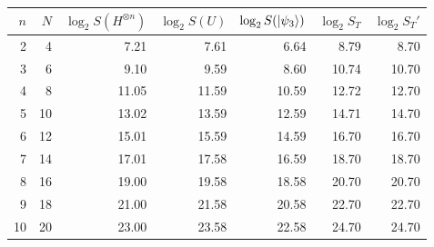 \begin{tabular}{rrrrrrr}
\toprule
	 $n$ &   $N$ &   $\log_2 S(H^{\otimes n})$ &   $\log_2 S(U)$ &   $\log_2 
S(\ket{\psi_3})$ &   $\log_2 S_T$ &   $\log_2 S_T'$ \\
\midrule
     2 &     4 &            7.21 &            7.61 &                       6.64 &           8.79 &            8.70 \\
     3 &     6 &            9.10 &            9.59 &                       8.60 &          10.74 &           10.70 \\
     4 &     8 &           11.05 &           11.59 &                      10.59 &          12.72 &           12.70 \\
     5 &    10 &           13.02 &           13.59 &                      12.59 &          14.71 &           14.70 \\
     6 &    12 &           15.01 &           15.59 &                      14.59 &          16.70 &           16.70 \\
     7 &    14 &           17.01 &           17.58 &                      16.59 &          18.70 &           18.70 \\
     8 &    16 &           19.00 &           19.58 &                      18.58 &          20.70 &           20.70 \\
     9 &    18 &           21.00 &           21.58 &                      20.58 &          22.70 &           22.70 \\
    10 &    20 &           23.00 &           23.58 &                      22.58 &          24.70 &           24.70 \\
\bottomrule
\end{tabular}
